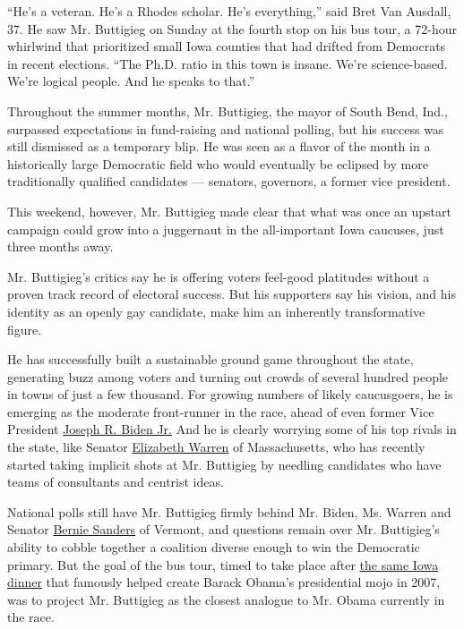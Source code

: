 ``He's a veteran. He's a Rhodes scholar. He's everything,'' said Bret
Van Ausdall, 37. He saw Mr. Buttigieg on Sunday at the fourth stop on
his bus tour, a 72-hour whirlwind that prioritized small Iowa counties
that had drifted from Democrats in recent elections. ``The Ph.D. ratio
in this town is insane. We're science-based. We're logical people. And
he speaks to that.''

Throughout the summer months, Mr. Buttigieg, the mayor of South Bend,
Ind., surpassed expectations in fund-raising and national polling, but
his success was still dismissed as a temporary blip. He was seen as a
flavor of the month in a historically large Democratic field who would
eventually be eclipsed by more traditionally qualified candidates ---
senators, governors, a former vice president.

This weekend, however, Mr. Buttigieg made clear that what was once an
upstart campaign could grow into a juggernaut in the all-important Iowa
caucuses, just three months away.

Mr. Buttigieg's critics say he is offering voters feel-good platitudes
without a proven track record of electoral success. But his supporters
say his vision, and his identity as an openly gay candidate, make him an
inherently transformative figure.

He has successfully built a sustainable ground game throughout the
state, generating buzz among voters and turning out crowds of several
hundred people in towns of just a few thousand. For growing numbers of
likely caucusgoers, he is emerging as the moderate front-runner in the
race, ahead of even former Vice President
\href{https://www.nytimes3xbfgragh.onion/interactive/2020/us/elections/joe-biden.html}{Joseph
R. Biden Jr.} And he is clearly worrying some of his top rivals in the
state, like Senator
\href{https://www.nytimes3xbfgragh.onion/interactive/2020/us/elections/elizabeth-warren.html}{Elizabeth
Warren} of Massachusetts, who has recently started taking implicit shots
at Mr. Buttigieg by needling candidates who have teams of consultants
and centrist ideas.

National polls still have Mr. Buttigieg firmly behind Mr. Biden, Ms.
Warren and Senator
\href{https://www.nytimes3xbfgragh.onion/interactive/2020/us/elections/bernie-sanders.html}{Bernie
Sanders} of Vermont, and questions remain over Mr. Buttigieg's ability
to cobble together a coalition diverse enough to win the Democratic
primary. But the goal of the bus tour, timed to take place after
\href{https://www.nytimes3xbfgragh.onion/2019/11/01/us/politics/iowa-democrats.html}{the
same Iowa dinner} that famously helped create Barack Obama's
presidential mojo in 2007, was to project Mr. Buttigieg as the closest
analogue to Mr. Obama currently in the race.


